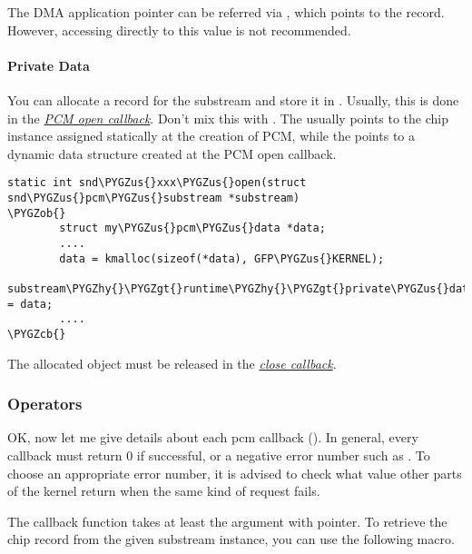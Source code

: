 \documentclass[a4paper,8pt,english]{sphinxmanual}
\def\PYGZus{\char`\_}
\def\PYGZob{\char`\{}
\def\PYGZcb{\char`\}}
\def\PYGZgt{\char`\>}
\def\PYGZhy{\char`\-}
\begin{document}
The DMA application pointer can be referred via ,
which points to the  record. However, accessing directly to
this value is not recommended.


\paragraph{Private Data}
\label{sound/kernel-api/writing-an-alsa-driver:private-data}
You can allocate a record for the substream and store it in
. Usually, this is done in the {\hyperref[sound/kernel\string-api/writing\string-an\string-alsa\string-driver:pcm\string-open\string-callback]{\emph{PCM open
callback}}}. Don't mix this with . The
 usually points to the chip instance assigned
statically at the creation of PCM, while the 
points to a dynamic data structure created at the PCM open
callback.

\begin{Verbatim}[commandchars=\\\{\}]
static int snd\PYGZus{}xxx\PYGZus{}open(struct snd\PYGZus{}pcm\PYGZus{}substream *substream)
\PYGZob{}
        struct my\PYGZus{}pcm\PYGZus{}data *data;
        ....
        data = kmalloc(sizeof(*data), GFP\PYGZus{}KERNEL);
        substream\PYGZhy{}\PYGZgt{}runtime\PYGZhy{}\PYGZgt{}private\PYGZus{}data = data;
        ....
\PYGZcb{}
\end{Verbatim}

The allocated object must be released in the {\hyperref[sound/kernel\string-api/writing\string-an\string-alsa\string-driver:close\string-callback]{\emph{close callback}}}.


\subsubsection{Operators}
\label{sound/kernel-api/writing-an-alsa-driver:operators}
OK, now let me give details about each pcm callback (). In
general, every callback must return 0 if successful, or a negative
error number such as . To choose an appropriate error
number, it is advised to check what value other parts of the kernel
return when the same kind of request fails.

The callback function takes at least the argument with  pointer. To retrieve the chip
record from the given substream instance, you can use the following
macro.
\end{document}
